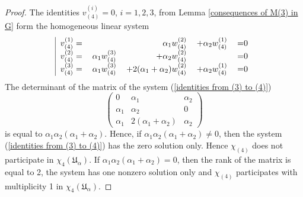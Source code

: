 \documentclass[10pt,a4paper]{amsart}
\begin{document}
\begin{proof}
The identities $v^{(i)}_{(4)}=0$, $i=1,2,3$, from Lemma \ref{consequences of M(3) in G} form the homogeneous linear system
\begin{equation}
\text{
\begin{tabular}{|rrrrl}\label{identities from (3) to (4)}
$v^{(1)}_{(4)}=$&&$\alpha_1w_{(4)}^{(2)}$&$+\alpha_2w_{(4)}^{(1)}$&=0\\
$v^{(2)}_{(4)}=$&$\alpha_1w_{(4)}^{(3)}$&$+\alpha_2w_{(4)}^{(2)}$&&=0\\
$v^{(3)}_{(4)}=$&$\alpha_1w_{(4)}^{(3)}$&$+2(\alpha_1+\alpha_2)w_{(4)}^{(2)}$&$+\alpha_2w_{(4)}^{(1)}$&=0\\
\end{tabular}
}
\end{equation}
The determinant of the matrix of the system (\ref{identities from (3) to (4)})
\[
\left(\begin{matrix}
0&\alpha_1&\alpha_2\\
\alpha_1&\alpha_2&0\\
\alpha_1&2(\alpha_1+\alpha_2)&\alpha_2
\end{matrix}\right)
\]
is equal to $\alpha_1\alpha_2(\alpha_1+\alpha_2)$. Hence, if $\alpha_1\alpha_2(\alpha_1+\alpha_2)\not=0$, then the system
(\ref{identities from (3) to (4)}) has the zero solution only. Hence $\chi_{(4)}$ does not participate in $\chi_4({\mathfrak U}_{\alpha})$.
If $\alpha_1\alpha_2(\alpha_1+\alpha_2)=0$, then the rank of the matrix is equal to 2, the system has one nonzero solution only
and $\chi_{(4)}$ participates with multiplicity 1 in $\chi_4({\mathfrak U}_{\alpha})$.


\end{proof}
\end{document}
